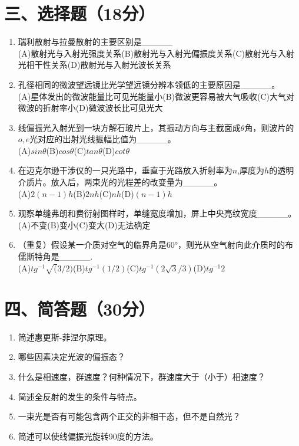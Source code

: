 \documentclass[12pt, a4paper]{article}
\theoremstyle{solution}
\begin{document}
\section*{三、选择题（18分）}
\begin{enumerate}
    \item 瑞利散射与拉曼散射的主要区别是\_\_\_\_\_\\(A)散射光与入射光强度关系\quad(B)散射光与入射光偏振度关系\quad (C)散射光与入射光相干性关系\quad (D)散射光与入射光波长关系
    \item 孔径相同的微波望远镜比光学望远镜分辨本领低的主要原因是\_\_\_\_\_。\\(A)星体发出的微波能量比可见光能量小\quad(B)微波更容易被大气吸收\quad(C)大气对微波的折射率小\quad(D)微波波长比可见光大
    \item 线偏振光入射光到一块方解石玻片上，其振动方向与主截面成$\theta$角，则波片的$o,e$光对应的出射光线振幅比值为\_\_\_\_\_。\\(A)$sin\theta$\quad(B)$cos\theta$(C)$tan\theta$\quad(D)$cot\theta$
    \item 在迈克尔逊干涉仪的一只光路中，垂直于光路放入折射率为$n$,厚度为$h$的透明介质片。放入后，两束光的光程差的改变量为\_\_\_\_\_。\\(A)$2(n-1)h$\quad (B)$2nh$\quad(C)$nh$\quad(D)$(n-1)h$
    \item 观察单缝弗朗和费衍射图样时，单缝宽度增加，屏上中央亮纹宽度\_\_\_\_\_。\\(A)不变\quad(B)变小\quad(C)变大\quad(D)无法确定
    \item （重复）假设某一介质对空气的临界角是60°，则光从空气射向此介质时的布儒斯特角是\_\_\_\_\_.\\(A)$tg^{-1}\sqrt({3}/2)$\qquad(B)$tg^{-1}(1/2)$\qquad(C)$tg^{-1}(2\sqrt{3}/3)$\qquad(D)$tg^{-1}2$
\end{enumerate}
\section*{四、简答题（30分）}
\begin{enumerate}
    \item 简述惠更斯-菲涅尔原理。
    \item 哪些因素决定光波的偏振态？
    \item 什么是相速度，群速度？何种情况下，群速度大于（小于）相速度？
    \item 简述全反射的发生的条件与特点。
    \item 一束光是否有可能包含两个正交的非相干态，但不是自然光？
    \item 简述可以使线偏振光旋转90度的方法。
\end{enumerate}
\end{document}
